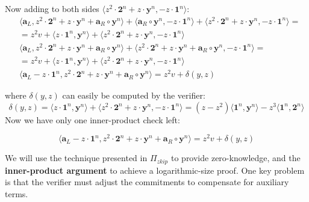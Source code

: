 \documentclass[../lecture-notes-148x210.tex]{subfiles}
\begin{document}
Now adding to both sides $\langle z^2 \cdot \mathbf{2}^n + z \cdot \mathbf{y}^n, - z \cdot \mathbf{1}^n \rangle$:
\begin{equation*}
    \begin{aligned}
        & \langle \mathbf{a}_L, z^2 \cdot \mathbf{2}^n + z \cdot \mathbf{y}^n + \mathbf{a}_R \circ \mathbf{y}^n\rangle + \langle \mathbf{a}_R \circ \mathbf{y}^n, - z \cdot \mathbf{1}^n \rangle + \boxed{\langle z^2 \cdot \mathbf{2}^n + z \cdot \mathbf{y}^n, - z \cdot \mathbf{1}^n \rangle} = \\
        & = z^2v + \langle z \cdot \mathbf{1}^n, \mathbf{y}^n \rangle + \boxed{\langle z^2 \cdot \mathbf{2}^n + z \cdot \mathbf{y}^n, - z \cdot \mathbf{1}^n \rangle} \\
        & \langle \mathbf{a}_L, z^2 \cdot \mathbf{2}^n + z \cdot \mathbf{y}^n + \mathbf{a}_R \circ \mathbf{y}^n\rangle + \boxed{\langle z^2 \cdot \mathbf{2}^n + z \cdot \mathbf{y}^n + \mathbf{a}_R \circ \mathbf{y}^n, - z \cdot \mathbf{1}^n \rangle} = \\
        & = z^2v + \boxed{\langle z \cdot \mathbf{1}^n, \mathbf{y}^n \rangle + \langle z^2 \cdot \mathbf{2}^n + z \cdot \mathbf{y}^n, - z \cdot \mathbf{1}^n \rangle} \\
        & \langle \mathbf{a}_L - z \cdot \mathbf{1}^n, z^2 \cdot \mathbf{2}^n + z \cdot \mathbf{y}^n + \mathbf{a}_R \circ \mathbf{y}^n\rangle = z^2v + \boxed{\delta(y,z)}
    \end{aligned}
\end{equation*}

where $\delta(y,z)$ can easily be computed by the verifier:
$$\delta(y,z) = \langle z \cdot \mathbf{1}^n, \mathbf{y}^n \rangle + \langle z^2 \cdot \mathbf{2}^n + z \cdot \mathbf{y}^n, - z \cdot \mathbf{1}^n \rangle = (z-z^2)\langle \mathbf{1}^n, \mathbf{y}^n \rangle - z^3 \langle \mathbf{1}^n, \mathbf{2}^n \rangle $$
Now we have only one inner-product check left:

\begin{equation}
    \langle \mathbf{a}_L - z \cdot \mathbf{1}^n, z^2 \cdot \mathbf{2}^n + z \cdot \mathbf{y}^n + \mathbf{a}_R \circ \mathbf{y}^n\rangle = z^2v + \delta(y,z)
    \label{eq:inner_product_check}
\end{equation}

We will use the technique presented in $\Pi_{zkip}$ to provide zero-knowledge, and the \textbf{inner-product argument} to achieve a logarithmic-size proof. One key problem is that the verifier must adjust the commitments to compensate for auxiliary terms.
\end{document}
